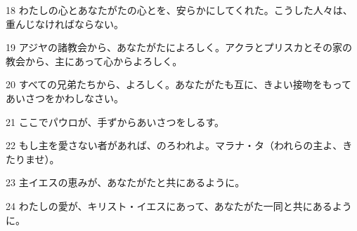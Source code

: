 \par 18 わたしの心とあなたがたの心とを、安らかにしてくれた。こうした人々は、重んじなければならない。
\par 19 アジヤの諸教会から、あなたがたによろしく。アクラとプリスカとその家の教会から、主にあって心からよろしく。
\par 20 すべての兄弟たちから、よろしく。あなたがたも互に、きよい接吻をもってあいさつをかわしなさい。
\par 21 ここでパウロが、手ずからあいさつをしるす。
\par 22 もし主を愛さない者があれば、のろわれよ。マラナ・タ（われらの主よ、きたりませ）。
\par 23 主イエスの恵みが、あなたがたと共にあるように。
\par 24 わたしの愛が、キリスト・イエスにあって、あなたがた一同と共にあるように。


